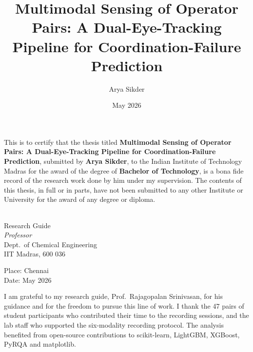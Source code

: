\documentclass[BTech]{iitmdiss}
\begin{document}
\title{Multimodal Sensing of Operator Pairs: A Dual-Eye-Tracking Pipeline for Coordination-Failure Prediction}
\author{Arya Sikder}
\date{May 2026}
\maketitle

\certificate
\vspace*{0.5in}
\noindent This is to certify that the thesis titled
{\bf Multimodal Sensing of Operator Pairs: A Dual-Eye-Tracking Pipeline for Coordination-Failure Prediction},
submitted by {\bf Arya Sikder}, to the Indian Institute of Technology Madras for the award of the degree of
{\bf Bachelor of Technology}, is a bona fide record of the research work done by him under my supervision.
The contents of this thesis, in full or in parts, have not been submitted to any other Institute or
University for the award of any degree or diploma.

\vspace*{1.0in}

\begin{singlespacing}
\hspace*{-0.25in}
\parbox{2.5in}{
 \\
\noindent Research Guide \\
\noindent \textit{Professor} \\
\noindent Dept.\ of Chemical Engineering \\
\noindent IIT Madras, 600 036
}
\hspace*{1.5in}
\parbox{2.5in}{
\vspace*{0.3in}
\noindent Place: Chennai \\
Date: May 2026
}
\end{singlespacing}

\acknowledgements

I am grateful to my research guide, Prof.\ Rajagopalan Srinivasan, for his guidance and for the freedom to pursue this line of work. I thank the 47 pairs of student participants who contributed their time to the recording sessions, and the lab staff who supported the six-modality recording protocol. The analysis benefited from open-source contributions to scikit-learn, LightGBM, XGBoost, PyRQA and matplotlib.
\end{document}
